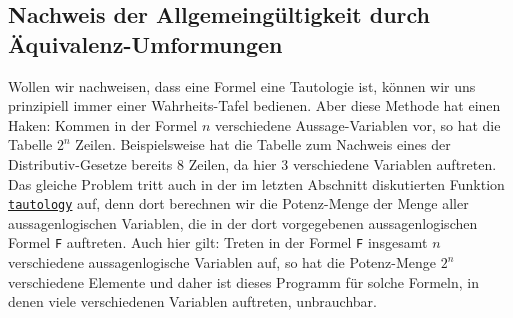 \subsection{Nachweis der Allgemeingültigkeit durch Äquivalenz-Umformungen}
Wollen wir nachweisen, dass eine Formel eine Tautologie ist, können wir uns prinzipiell
immer einer Wahrheits-Tafel bedienen. 
Aber diese Methode hat einen Haken: Kommen in der Formel $n$
verschiedene Aussage-Variablen vor, so hat die Tabelle $2^n$ Zeilen.  Beispielsweise hat
die Tabelle zum Nachweis eines der Distributiv-Gesetze bereits 
$8$ Zeilen, da hier 3 verschiedene Variablen auftreten.
Das gleiche Problem tritt auch in der im letzten Abschnitt diskutierten Funktion
\href{https://github.com/karlstroetmann/Logik/blob/master/Python/tautology.py}{\texttt{tautology}} auf,
denn dort berechnen wir die Potenz-Menge der Menge aller aussagenlogischen Variablen, die in der dort
vorgegebenen aussagenlogischen Formel \texttt{F} auftreten.  Auch hier gilt:  Treten in der Formel \texttt{F}
insgesamt $n$ verschiedene aussagenlogische Variablen auf, so hat die Potenz-Menge $2^n$ verschiedene Elemente
und daher ist dieses Programm für solche Formeln, in denen viele verschiedenen Variablen auftreten, unbrauchbar.

